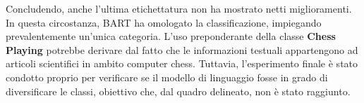Concludendo, anche l'ultima etichettatura non ha mostrato netti miglioramenti. In questa circostanza, BART ha omologato la classificazione, impiegando prevalentemente un'unica categoria. L'uso preponderante della classe \textbf{Chess Playing} potrebbe derivare dal fatto che le informazioni testuali appartengono ad articoli scientifici in ambito computer chess. Tuttavia, l'esperimento finale è stato condotto proprio per verificare se il modello di linguaggio fosse in grado di diversificare le classi, obiettivo che, dal quadro delineato, non è stato raggiunto.